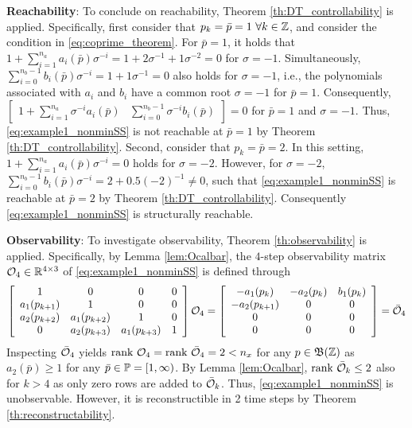 \textbf{Reachability}: To conclude on reachability, Theorem \ref{th:DT_controllability} is applied. Specifically, first consider that $p_k = \bar{p} = 1 \ \forall k\in\mathbb{Z}$, and consider the condition in \eqref{eq:coprime_theorem}. For $\bar{p}=1$, it holds that $1 + \sum_{i=1}^{n_a} a_i(\bar{p}) \sigma^{-i} = 1 + 2 \sigma^{-1} + 1 \sigma^{-2} = 0$ for $\sigma = -1$. Simultaneously, $\sum_{i=0}^{n_b-1} b_i(\bar{p}) \sigma^{-i} = 1 + 1 \sigma^{-1} = 0$ also holds for $\sigma=-1$, i.e., the polynomials associated with $a_i$ and $b_i$ have a common root $\sigma = -1$ for $\bar{p} = 1$. Consequently, $\begin{bmatrix} 1 + \sum_{i=1}^{n_a} \sigma^{-i}a_i(\bar{p}) & \sum_{i=0}^{n_b-1} \sigma^{-i} b_i(\bar{p}) \end{bmatrix} = 0$ for $\bar{p} = 1$ and $\sigma = -1$. Thus, \eqref{eq:example1_nonminSS} is not reachable at $\bar{p}=1$ by Theorem \ref{th:DT_controllability}. Second, consider that $p_k = \bar{p} = 2$. In this setting, $1 + \sum_{i=1}^{n_a} a_i(\bar{p}) \sigma^{-i} = 0$ holds for $\sigma = -2$. However, for $\sigma = -2$, $\sum_{i=0}^{n_b-1} b_i(\bar{p}) \sigma^{-i} = 2 + 0.5 (-2)^{-1} \neq 0$, such that \eqref{eq:example1_nonminSS} is reachable at $\bar{p}=2$ by Theorem \ref{th:DT_controllability}. Consequently \eqref{eq:example1_nonminSS} is structurally reachable.

\textbf{Observability}: To investigate observability, Theorem \ref{th:observability} is applied. Specifically, by Lemma \ref{lem:Ocalbar}, the $4$-step observability matrix $\mathcal{O}_4 \in \mathbb{R}^{4 \times 3}$ of \eqref{eq:example1_nonminSS} is defined through
\begin{align}
    \left[\begin{array}{cccc} 1 & 0 & 0 & 0\\ a_{1}(p_{k+1}) & 1 & 0 & 0\\ a_{2}(p_{k+2}) & a_{1}(p_{k+2}) & 1 & 0\\ 0 & a_{2}(p_{k+3}) & a_{1}(p_{k+3}) & 1 \end{array}\right] \mathcal{O}_4 
    =      
    \left[\begin{array}{ccc} -a_{1}(p_k) & -a_{2}(p_k) & b_{1}(p_k) \\ -a_{2}(p_{k+1}) & 0 & 0 \\ 0 & 0 & 0 \\ 0 & 0 & 0 \end{array}\right] = \bar{\mathcal{O}}_4
 \nonumber
\end{align}
Inspecting $\bar{\mathcal{O}}_4$ yields $\textrm{rank}\ {\mathcal{O}}_4= \textrm{rank}\ \bar{\mathcal{O}}_4 = 2 < n_x$ for any $p \in \mathfrak{B}(\mathbb{Z})$ as $a_2(\bar{p}) \geq 1$ for any $\bar{p} \in \mathbb{P} = [1,\infty)$. By Lemma \ref{lem:Ocalbar}, $\textrm{rank}\ \bar{\mathcal{O}}_k \leq 2$ also for $k > 4$ as only zero rows are added to  $\bar{\mathcal{O}}_k$. Thus, \eqref{eq:example1_nonminSS} is unobservable. However, it is reconstructible in 2 time steps by Theorem \ref{th:reconstructability}. 

